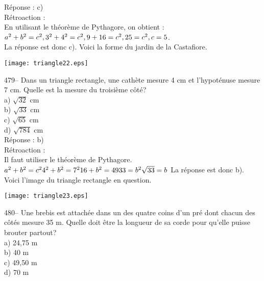 ﻿\documentclass[letterpaper, 12pt]{article}
\begin{document}
R\'eponse :  c)\\

R\'etroaction : \\
En utilisant le th\'eor\`eme de Pythagore, on obtient :\\
$a^{2}+b^{2}=c^{2},\\
3^{2}+4^{2}=c^{2},\\
9+16=c^{2},\\
25=c^{2},\\
c=5$.\\
La r\'eponse est donc c).  Voici la forme du jardin de la Castafiore.\\
    \begin{center}
    \texttt{[image: triangle22.eps]}
    \end{center}


479-- Dans un triangle rectangle, une cath\`ete mesure 4 cm et
l'hypot\'enuse mesure 7 cm.  Quelle est la mesure du troisi\`eme c\^ot\'e?\\
a) $\sqrt{32}$ cm\\
b) $\sqrt{33}$ cm\\
c) $\sqrt{65}$ cm\\
d) $\sqrt{784}$ cm\\

R\'eponse :  b)\\

R\'etroaction : \\
Il faut utiliser le th\'eor\`eme de Pythagore.  \\
$a^{2}+b^{2}=c^{2}\\
4^{2}+b^{2}=7^{2}\\
16+b^{2}=49\\
33=b^{2}\\
\sqrt{33}=b\\$
La r\'eponse est donc b).\\
Voici l'image du triangle rectangle en question.\\
    \begin{center}
    \texttt{[image: triangle23.eps]}
    \end{center}


480--  Une brebis est attach\'ee dans un des quatre coins d'un pr\'e dont
chacun des c\^ot\'es mesure 35 m.  Quelle doit \^etre la longueur de sa
corde pour qu'elle puisse brouter partout?\\
a) 24,75 m\\
b) 40 m\\
c) 49,50 m\\
d) 70 m\\
\end{document}
